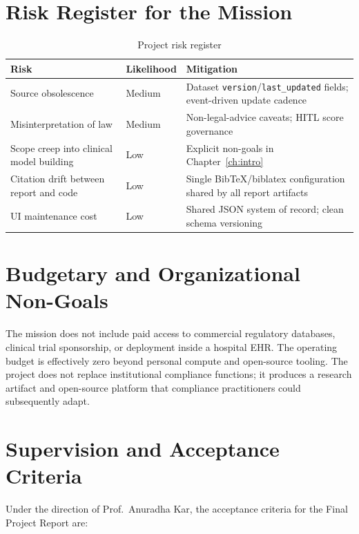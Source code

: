 \section{Risk Register for the Mission}
\label{sec:risks}

\begin{table}[htbp]
\centering
\caption{Project risk register}
\label{tab:risks}
\begin{tabular}{@{}p{3.0cm}p{2.2cm}p{5.8cm}@{}}
\toprule
\textbf{Risk} & \textbf{Likelihood} & \textbf{Mitigation} \\
\midrule
Source obsolescence & Medium & Dataset \texttt{version}/\texttt{last\_updated} fields;
  event-driven update cadence \\
Misinterpretation of law & Medium & Non-legal-advice caveats; HITL score governance \\
Scope creep into clinical model building & Low & Explicit non-goals in
  Chapter~\ref{ch:intro} \\
Citation drift between report and code & Low & Single BibTeX/biblatex configuration
  shared by all report artifacts \\
UI maintenance cost & Low & Shared JSON system of record; clean schema versioning \\
\bottomrule
\end{tabular}
\end{table}

\section{Budgetary and Organizational Non-Goals}
\label{sec:nongoals}

The mission does not include paid access to commercial regulatory databases, clinical
trial sponsorship, or deployment inside a hospital EHR. The operating budget is
effectively zero beyond personal compute and open-source tooling. The project does not
replace institutional compliance functions; it produces a research artifact and
open-source platform that compliance practitioners could subsequently adapt.

\section{Supervision and Acceptance Criteria}
\label{sec:collab}

Under the direction of Prof.\ Anuradha Kar, the acceptance criteria for the Final
Project Report are:

